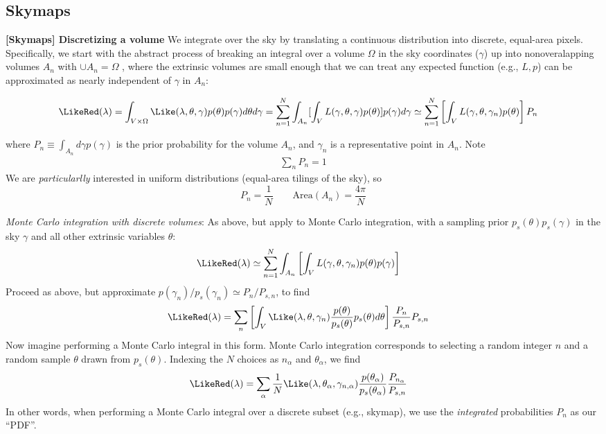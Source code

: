 \subsection{Skymaps}
\noindent \textbf{[Skymaps]  Discretizing a volume} We integrate over the sky by translating a continuous distribution into
discrete, equal-area pixels.  Specifically, we start with the abstract process of breaking an integral over a volume
$\Omega$ in the sky coordinates ($\gamma$)  up into nonoveralapping
volumes $A_n$ with $\cup A_n = \Omega$  , where the extrinsic volumes are small enough that we can treat any expected
function (e.g., $L,p$) can be approximated as nearly independent of $\gamma$ in $A_n$:
\begin{widetext}
\begin{align}
\LikeRed(\lambda)
& = \int_{V\times\Omega}\Like(\lambda,\theta,\gamma)p(\theta)p(\gamma) d \theta d\gamma 
=  \sum_{n=1}^N \int_{A_n} [\int_V  L(\gamma,\theta,\gamma) p(\theta) ] p(\gamma)d\gamma 
 \simeq  \sum_{n=1}^N  \left [\int_V  L(\gamma,\theta,\gamma_n) p(\theta) \right] P_n 
\end{align}\end{widetext}
where $P_n \equiv \int_{A_n} d\gamma p(\gamma)$ is the prior probability for the volume $A_n$, and $\gamma_n$ is a
representative point in $A_n$.   Note
\begin{eqnarray}
\sum_n P_n =1
\end{eqnarray}
We are \emph{particularlly} interested in uniform distributions (equal-area tilings of the sky), so 
\[
P_n = \frac{1}{N} \qquad   \text{Area}(A_n) = \frac{4\pi}{N}
\]

\noindent \emph{Monte Carlo integration with discrete volumes}: As above, but apply to Monte Carlo integration, with a
sampling prior $p_s(\theta)p_s(\gamma)$ in the sky $\gamma$ and all other extrinsic variables $\theta$:
\begin{align}
\LikeRed(\lambda)
& \simeq  \sum_{n=1}^N \int_{A_n} \left [\int_V  L(\gamma,\theta,\gamma_n) p(\theta)p(\gamma) \right]
\end{align}
Proceed as above, but approximate $p(\gamma_n)/p_s(\gamma_n) \simeq P_n/P_{s,n}$, to find
\begin{align}
\LikeRed(\lambda)
& =\sum_n \left[\int_{V}\Like(\lambda,\theta,\gamma_n)\frac{p(\theta)}{p_s(\theta)}p_s(\theta)d\theta \right] \frac{ P_n }{P_{s,n}} P_{s,n}
\end{align}
Now imagine performing a Monte Carlo integral in this form.   Monte Carlo integration corresponds to selecting a random
integer $n$ and a random sample $\theta$ drawn from $p_s(\theta)$.  Indexing the $N$ choices as $n_{\alpha}$ and
$\theta_\alpha$, we find
\begin{align}
\LikeRed(\lambda)
& = \sum_{\alpha}\frac{1}{N}
\Like(\lambda,\theta_{\alpha},\gamma_{n,\alpha})\frac{p(\theta_\alpha)}{p_s(\theta_\alpha)} \frac{ P_{n_\alpha}
}{P_{s,n}} 
\end{align}
In other words, when performing a Monte Carlo integral over a discrete subset (e.g., skymap), we use the
\emph{integrated} probabilities $P_n$ as our ``PDF''.

